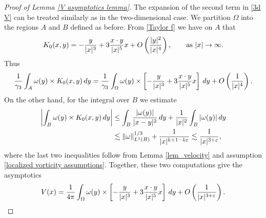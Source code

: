 \documentclass[11pt,reqno]{amsart}
\theoremstyle{plain}
\theoremstyle{remark}
\numberwithin{equation}{section}
\begin{document}
\begin{proof}[Proof of Lemma \ref{V asymptotics lemma}]
The expansion of the second term in \eqref{3d V} can be treated similarly as in the two-dimensional case. We partition $\Omega$ into the regions $A$ and $B$ defined as before. From \eqref{Taylor f} we have on $A$ that
\begin{align*}
K_0(x, y) = -{y\over |x|^3} + 3{x\cdot y\over |x|^5} x + O\left( {|y|^2\over |x|^4} \right), \qquad \textrm{as $|x|\to \infty$.}
\end{align*} 
Thus
\begin{align*}
{1\over \gamma_3} \int_A \omega(y) \times K_0(x, y) \, dy = {1\over \gamma_3} \int_\Omega \omega(y) \times \left[ -{y\over |x|^3} + 3{x\cdot y\over |x|^5} x \right] \, dy + O\left( {1\over |x|^4} \right). 
\end{align*}
On the other hand, for the integral over  $B$ we estimate 
\begin{align*}
\left| \int_B \omega(y) \times K_0(x, y) \, dy \right| & \le \int_B {|\omega(y)| \over |x - y|^2} \, dy + {1\over |x|^2} \int_{B}|\omega(y)|\, dy \\
& \lesssim \| \omega \|_{L^1(B)}^{1/3}+ {1\over |x|^{k+1-k\varepsilon}} \lesssim {1\over |x|^{3+\varepsilon}},
\end{align*}
where the last two inequalities follow from Lemma \ref{lem_velocity} and assumption \eqref{localized vorticity assumptions}.  Together, these two computations give the asymptotics 
\begin{equation*}
V(x) = {1\over 4\pi} \int_\Omega \omega(y) \times \left[ -{y\over |x|^3} + 3{x\cdot y\over |x|^5} x \right]\, dy + O\left( {1\over |x|^{3+\varepsilon}} \right).
\end{equation*}


\end{proof}
\end{document}
